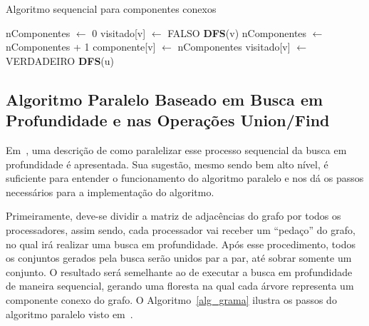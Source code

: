 \documentclass[12pt]{article}
\begin{document}
\begin{algorithm}[H]
    \DontPrintSemicolon
    \caption{Algoritmo sequencial para componentes conexos}
    \label{alg_seq}
	{
        nComponentes $\gets$ 0\;
        {
            visitado[v] $\gets$ FALSO\;
        }
        {
            {
                \textbf{DFS}(v)\;
                nComponentes $\gets$ nComponentes + 1\;
            }
        }
    }
    {
        componente[v] $\gets$ nComponentes\; 
        visitado[v] $\gets$ VERDADEIRO\;
        {
            {
                \textbf{DFS}(u)\;
            }
        }
    }
\end{algorithm}

\subsection{Algoritmo Paralelo Baseado em Busca em Profundidade e nas Operações Union/Find}

Em~\cite{Grama:2003}, uma descrição de como paralelizar esse processo sequencial da busca em profundidade é apresentada. Sua sugestão, mesmo sendo bem alto nível, é suficiente para entender o funcionamento do algoritmo paralelo e nos dá os passos necessários para a implementação do algoritmo. 

Primeiramente, deve-se dividir a matriz de adjacências do grafo por todos os processadores, assim sendo, cada processador vai receber um ``pedaço'' do grafo, no qual irá realizar uma busca em profundidade. Após esse procedimento, todos os conjuntos gerados pela busca serão unidos par a par, até sobrar somente um conjunto. O resultado será semelhante ao de executar a busca em profundidade de maneira sequencial, gerando uma floresta na qual cada árvore representa um componente conexo do grafo. O Algoritmo~\ref{alg_grama} ilustra os passos do algoritmo paralelo visto em~\cite{Grama:2003}.
\end{document}
